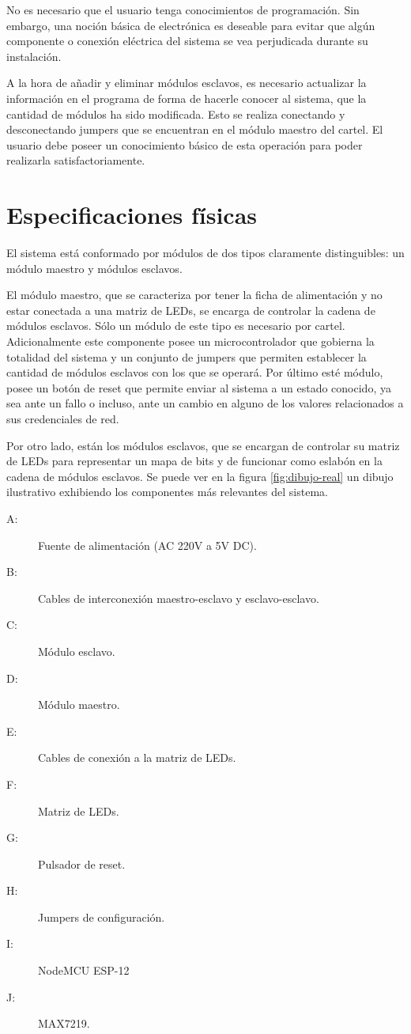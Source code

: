 	No es necesario que el usuario tenga conocimientos de programación.
	Sin embargo, una noción básica de electrónica es deseable para evitar que algún componente o conexión eléctrica del sistema se vea perjudicada durante su instalación.
	
	A la hora de añadir y eliminar módulos esclavos, es necesario actualizar la información en el programa de forma de hacerle conocer al sistema, que la cantidad de módulos ha sido modificada. Esto se realiza conectando y desconectando jumpers que se encuentran en el módulo maestro del cartel.
	El usuario debe poseer un conocimiento básico de esta operación para poder realizarla satisfactoriamente.
	
	

\section{Especificaciones físicas}

	El sistema está conformado por módulos de dos tipos claramente distinguibles: un módulo maestro y módulos esclavos.

	El módulo maestro, que se caracteriza por tener la ficha de alimentación y no estar conectada a una matriz de LEDs, se encarga de controlar la cadena de módulos esclavos. Sólo un módulo de este tipo es necesario por cartel.
	Adicionalmente este componente posee un microcontrolador que gobierna la totalidad del sistema y un conjunto de jumpers que permiten establecer la cantidad de módulos esclavos con los que se operará.
	Por último esté módulo, posee un botón de reset que permite enviar al sistema a un estado conocido, ya sea ante un fallo o incluso, ante un cambio en alguno de los valores relacionados a sus credenciales de red.

	Por otro lado, están los módulos esclavos, que se encargan de controlar su matriz de LEDs para representar un mapa de bits y de funcionar como eslabón en la cadena de módulos esclavos. Se puede ver en la figura \ref{fig:dibujo-real} un dibujo ilustrativo exhibiendo los componentes más relevantes del sistema.
	\begin{description}
		\item[A: ] Fuente de alimentación (AC 220V a 5V DC).
		\item[B: ] Cables de interconexión maestro-esclavo y esclavo-esclavo.
		\item[C: ] Módulo esclavo.
		\item[D: ] Módulo maestro.
		\item[E: ] Cables de conexión a la matriz de LEDs.
		\item[F: ] Matriz de LEDs.
		\item[G: ] Pulsador de reset.
		\item[H: ] Jumpers de configuración.
		\item[I: ] NodeMCU ESP-12
		\item[J: ] MAX7219.
	\end{description}
	
